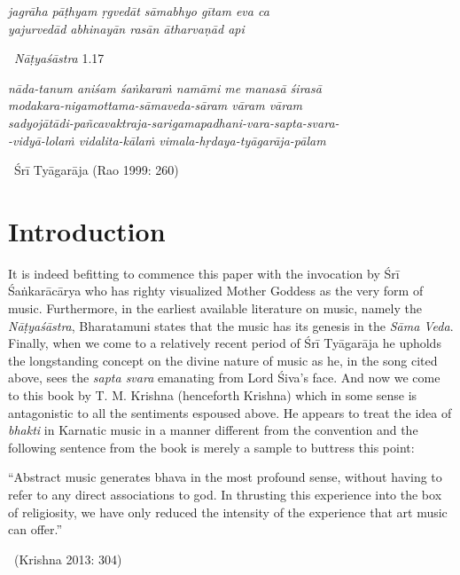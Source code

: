 \begin{myquote}
\textit{jagrāha pāṭhyam ṛgvedāt sāmabhyo gītam eva ca }\\ \textit{yajurvedād abhinayān rasān ātharvaṇād api } 

~\hfill \textit{Nāṭyaśāstra} 1.17
\end{myquote}

\begin{myquote}
\textit{nāda-tanum aniśam śaṅkaraṁ namāmi me manasā śirasā}\\ \textit{modakara-nigamottama-sāmaveda-sāram vāram vāram}\\ \textit{sadyojātādi-pañcavaktraja-sarigamapadhani-vara-sapta-svara-}\\ \textit{-vidyā-lolaṁ vidalita-kālaṁ vimala-hṛdaya-tyāgarāja-pālam} 

~\hfill Śrī Tyāgarāja (Rao 1999: 260)
\end{myquote}

\vspace{-.5cm}

\section*{Introduction}

It is indeed befitting to commence this paper with the invocation by Śrī Śaṅkarācārya who has righty visualized Mother Goddess as the very form of music. Furthermore, in the earliest available literature on music, namely the \textit{Nāṭyaśāstra}, Bharatamuni states that the music has its genesis in the \textit{Sāma Veda}. Finally, when we come to a relatively recent period of Śrī Tyāgarāja he upholds the longstanding concept on the divine nature of music as he, in the song cited above, sees the \textit{sapta svara} emanating from Lord Śiva’s face. And now we come to this book by T. M. Krishna (henceforth Krishna) which in some sense is antagonistic to all the sentiments espoused above. He appears to treat the idea of \textit{bhakti} in Karnatic music in a manner different from the convention and the following sentence from the book is merely a sample to buttress this point:

\begin{myquote}
“Abstract music generates bhava in the most profound sense, without having to refer to any direct associations to god. In thrusting this experience into the box of religiosity, we have only reduced the intensity of the experience that art music can offer.” 

~\hfill (Krishna 2013: 304)
\end{myquote}

